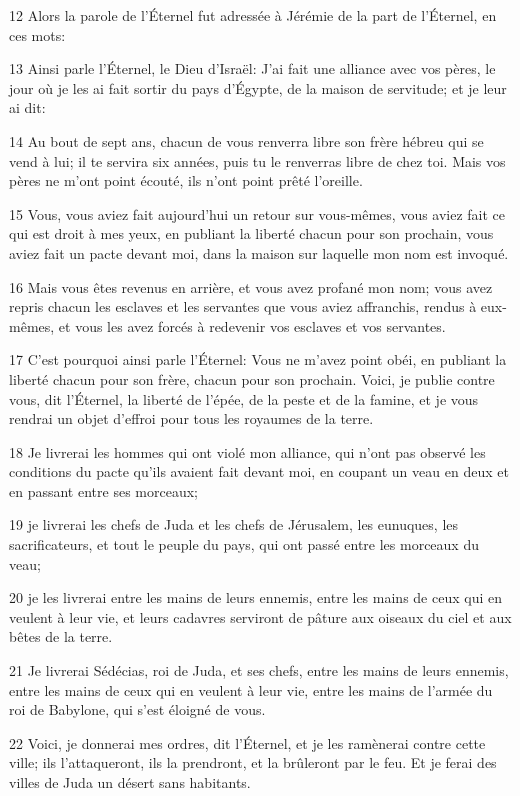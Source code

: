 \par 12 Alors la parole de l'Éternel fut adressée à Jérémie de la part de l'Éternel, en ces mots:
\par 13 Ainsi parle l'Éternel, le Dieu d'Israël: J'ai fait une alliance avec vos pères, le jour où je les ai fait sortir du pays d'Égypte, de la maison de servitude; et je leur ai dit:
\par 14 Au bout de sept ans, chacun de vous renverra libre son frère hébreu qui se vend à lui; il te servira six années, puis tu le renverras libre de chez toi. Mais vos pères ne m'ont point écouté, ils n'ont point prêté l'oreille.
\par 15 Vous, vous aviez fait aujourd'hui un retour sur vous-mêmes, vous aviez fait ce qui est droit à mes yeux, en publiant la liberté chacun pour son prochain, vous aviez fait un pacte devant moi, dans la maison sur laquelle mon nom est invoqué.
\par 16 Mais vous êtes revenus en arrière, et vous avez profané mon nom; vous avez repris chacun les esclaves et les servantes que vous aviez affranchis, rendus à eux-mêmes, et vous les avez forcés à redevenir vos esclaves et vos servantes.
\par 17 C'est pourquoi ainsi parle l'Éternel: Vous ne m'avez point obéi, en publiant la liberté chacun pour son frère, chacun pour son prochain. Voici, je publie contre vous, dit l'Éternel, la liberté de l'épée, de la peste et de la famine, et je vous rendrai un objet d'effroi pour tous les royaumes de la terre.
\par 18 Je livrerai les hommes qui ont violé mon alliance, qui n'ont pas observé les conditions du pacte qu'ils avaient fait devant moi, en coupant un veau en deux et en passant entre ses morceaux;
\par 19 je livrerai les chefs de Juda et les chefs de Jérusalem, les eunuques, les sacrificateurs, et tout le peuple du pays, qui ont passé entre les morceaux du veau;
\par 20 je les livrerai entre les mains de leurs ennemis, entre les mains de ceux qui en veulent à leur vie, et leurs cadavres serviront de pâture aux oiseaux du ciel et aux bêtes de la terre.
\par 21 Je livrerai Sédécias, roi de Juda, et ses chefs, entre les mains de leurs ennemis, entre les mains de ceux qui en veulent à leur vie, entre les mains de l'armée du roi de Babylone, qui s'est éloigné de vous.
\par 22 Voici, je donnerai mes ordres, dit l'Éternel, et je les ramènerai contre cette ville; ils l'attaqueront, ils la prendront, et la brûleront par le feu. Et je ferai des villes de Juda un désert sans habitants.

